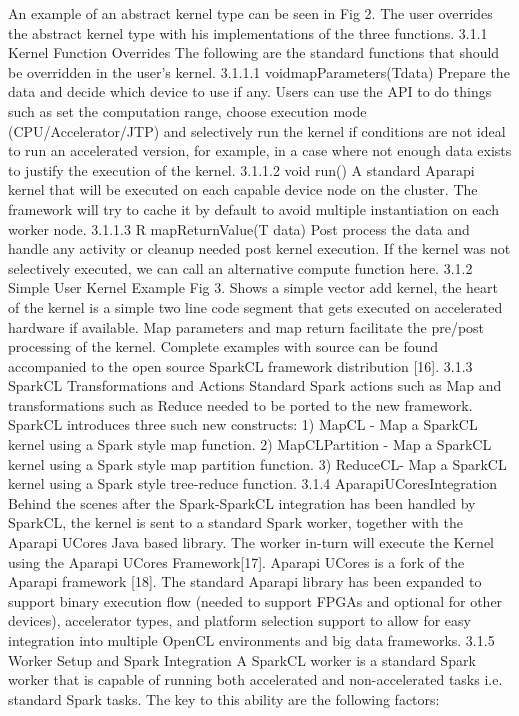 \documentclass[runningheads,a4paper]{llncs}
\begin{document}
An example of an abstract kernel type can be seen in Fig 2. The user overrides the abstract kernel type with his implementations of the three functions.
3.1.1 Kernel Function Overrides
The following are the standard functions that should be overridden in the user’s kernel.
3.1.1.1 voidmapParameters(Tdata)
Prepare the data and decide which device to use if any. Users can use the API to do things such as set the computation range, choose execution mode (CPU/Accelerator/JTP) and selectively run the kernel if conditions are not ideal to run an accelerated version, for example, in a case where not enough data exists to justify the execution of the kernel.
3.1.1.2 void run()
A standard Aparapi kernel that will be executed on each capable device node on the cluster. The framework will try to cache it by default to avoid multiple instantiation on each worker node.
3.1.1.3 R mapReturnValue(T data)
Post process the data and handle any activity or cleanup needed post kernel execution. If the kernel was not selectively executed, we can call an alternative compute function here.
3.1.2 Simple User Kernel Example
Fig 3. Shows a simple vector add kernel, the heart of the kernel is a simple two line code segment that gets executed on accelerated hardware if available. Map parameters and map return facilitate the pre/post processing of the kernel. Complete examples with source can be found accompanied to the open source SparkCL framework distribution [16].
3.1.3 SparkCL Transformations and Actions
Standard Spark actions such as Map and transformations such as Reduce needed to be ported to the new framework. SparkCL introduces three such new constructs:
1) MapCL - Map a SparkCL kernel using a Spark style map function.
2) MapCLPartition - Map a SparkCL kernel using a Spark style map partition function.
3) ReduceCL- Map a SparkCL kernel using a Spark style tree-reduce function.
3.1.4 AparapiUCoresIntegration
Behind the scenes after the Spark-SparkCL integration has been handled by SparkCL, the kernel is sent to a standard Spark worker, together with the Aparapi UCores Java based library. The worker in-turn will execute the Kernel using the Aparapi UCores Framework[17]. Aparapi UCores is a fork of the Aparapi framework [18]. The standard Aparapi library has been expanded to support binary execution flow (needed to support FPGAs and optional for other devices), accelerator types, and platform selection support to allow for easy integration into multiple OpenCL environments and big data frameworks.
3.1.5 Worker Setup and Spark Integration
A SparkCL worker is a standard Spark worker that is capable of running both accelerated and non-accelerated tasks i.e. standard Spark tasks. The key to this ability are the following factors:
\end{document}
